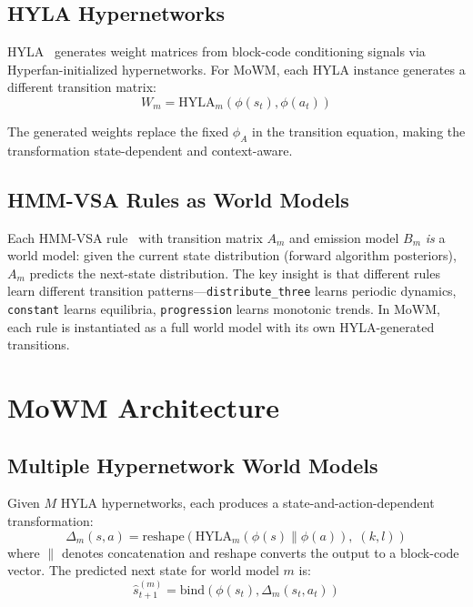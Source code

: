 \documentclass[journal]{IEEEtai}
\begin{document}
\subsection{HYLA Hypernetworks}

HYLA~\cite{grillcheese2025hmm} generates weight matrices from block-code conditioning signals via Hyperfan-initialized hypernetworks. For MoWM, each HYLA instance generates a different transition matrix:
\begin{equation}
W_m = \mathrm{HYLA}_m(\phi(s_t), \phi(a_t))
\end{equation}

The generated weights replace the fixed $\phi_A$ in the transition equation, making the transformation state-dependent and context-aware.

\subsection{HMM-VSA Rules as World Models}

Each HMM-VSA rule~\cite{grillcheese2025hmm} with transition matrix $A_m$ and emission model $B_m$ \emph{is} a world model: given the current state distribution (forward algorithm posteriors), $A_m$ predicts the next-state distribution. The key insight is that different rules learn different transition patterns---\texttt{distribute\_three} learns periodic dynamics, \texttt{constant} learns equilibria, \texttt{progression} learns monotonic trends. In MoWM, each rule is instantiated as a full world model with its own HYLA-generated transitions.

\section{MoWM Architecture}

\subsection{Multiple Hypernetwork World Models}

Given $M$ HYLA hypernetworks, each produces a state-and-action-dependent transformation:
\begin{equation}
\Delta_m(s, a) = \mathrm{reshape}\!\left(\mathrm{HYLA}_m(\phi(s) \| \phi(a)),\; (k, l)\right)
\end{equation}
where $\|$ denotes concatenation and reshape converts the output to a block-code vector. The predicted next state for world model $m$ is:
\begin{equation}
\hat{s}_{t+1}^{(m)} = \mathrm{bind}(\phi(s_t), \Delta_m(s_t, a_t))
\end{equation}
\end{document}
